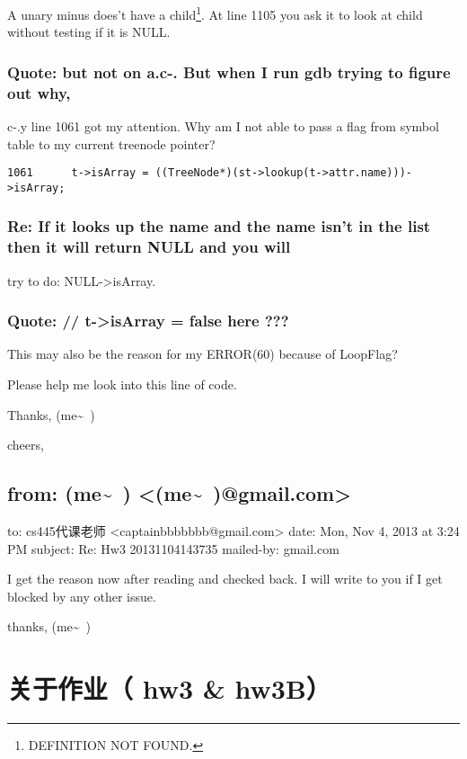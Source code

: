 \documentclass[12pt]{book}
\begin{document}
A unary minus does't have a child\footnote{DEFINITION NOT FOUND.}.   At line 1105 you ask it to look at child\footnotemark[1]{} without testing if it is NULL.

\subsection{Quote: but not on a.c-. But when I run gdb trying to figure out why,}
\label{sec-28-4-3}

c-.y line 1061 got my attention.  Why am I not able to pass a flag from symbol table to my current treenode pointer?
\lstset{language=java,label= ,caption= ,numbers=none}
\begin{lstlisting}
1061	  t->isArray = ((TreeNode*)(st->lookup(t->attr.name)))->isArray;
\end{lstlisting}

\subsection{Re: If it looks up the name and the name isn't in the list then it will return NULL and you will}
\label{sec-28-4-4}
try to do:  NULL->isArray.

\subsection{Quote: // t->isArray = false here ???}
\label{sec-28-4-5}

This may also be the reason for my ERROR(60) because of LoopFlag?

Please help me look into this line of code.  

Thanks,
(me\textasciitilde{}~)

cheers,

\section{from:         (me\textasciitilde{}~) <(me\textasciitilde{}~)@gmail.com>}
\label{sec-28-5}
to:         cs445代课老师 <captainbbbbbbb@gmail.com>
date:         Mon, Nov 4, 2013 at 3:24 PM
subject:         Re: Hw3  20131104143735
mailed-by:         gmail.com

I get the reason now after reading and checked back. I will write to you if I get blocked by any other issue. 

thanks,
(me\textasciitilde{}~)

\chapter{关于作业（ hw3 \& hw3B）}
\label{sec-29}
\end{document}
